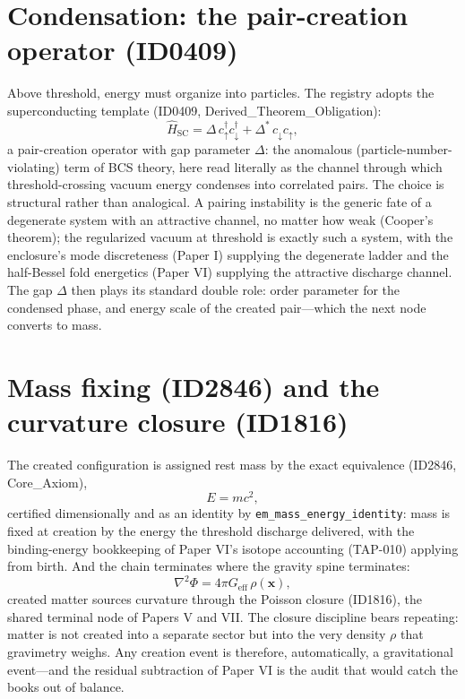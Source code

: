 \documentclass[11pt]{article}
\theoremstyle{remark}
\begin{document}
\section{Condensation: the pair-creation operator (ID0409)}
\label{sec:condensation}

Above threshold, energy must organize into particles. The registry adopts the superconducting template (ID0409, Derived\_Theorem\_Obligation):
\begin{equation}
\hat{H}_{\mathrm{SC}} = \Delta\, c^\dagger_\uparrow c^\dagger_\downarrow + \Delta^*\, c_\downarrow c_\uparrow,
\label{eq:pairing}
\end{equation}
a pair-creation operator with gap parameter $\Delta$: the anomalous (particle-number-violating) term of BCS theory, here read literally as the channel through which threshold-crossing vacuum energy condenses into correlated pairs. The choice is structural rather than analogical. A pairing instability is the generic fate of a degenerate system with an attractive channel, no matter how weak (Cooper's theorem); the regularized vacuum at threshold is exactly such a system, with the enclosure's mode discreteness (Paper I) supplying the degenerate ladder and the half-Bessel fold energetics (Paper VI) supplying the attractive discharge channel. The gap $\Delta$ then plays its standard double role: order parameter for the condensed phase, and energy scale of the created pair---which the next node converts to mass.

\section{Mass fixing (ID2846) and the curvature closure (ID1816)}
\label{sec:closure}

The created configuration is assigned rest mass by the exact equivalence (ID2846, Core\_Axiom),
\begin{equation}
E = mc^2,
\label{eq:emc2}
\end{equation}
certified dimensionally and as an identity by \texttt{em\_mass\_energy\_identity}: mass is fixed at creation by the energy the threshold discharge delivered, with the binding-energy bookkeeping of Paper VI's isotope accounting (TAP-010) applying from birth. And the chain terminates where the gravity spine terminates:
\begin{equation}
\nabla^2 \Phi = 4\pi G_{\mathrm{eff}}\, \rho(\mathbf{x}),
\label{eq:poisson}
\end{equation}
created matter sources curvature through the Poisson closure (ID1816), the shared terminal node of Papers V and VII. The closure discipline bears repeating: matter is not created into a separate sector but into the very density $\rho$ that gravimetry weighs. Any creation event is therefore, automatically, a gravitational event---and the residual subtraction of Paper VI is the audit that would catch the books out of balance.
\end{document}
